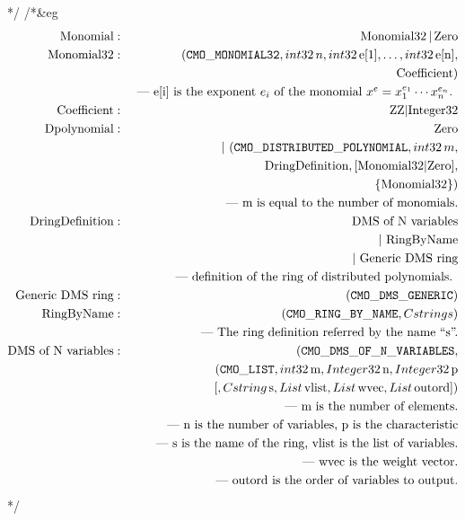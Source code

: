 */
/*&eg
\begin{eqnarray*}
\mbox{Monomial} &:& \mbox{Monomial32}\, |\, \mbox{Zero} \\
\mbox{Monomial32}&:& ({\tt CMO\_MONOMIAL32}, {\sl int32}\, n,
                      {\sl int32}\, \mbox{e[1]}, \ldots,
                      {\sl int32}\, \mbox{e[n]}, \\
                 & & \ \mbox{Coefficient}) \\
                 & & \mbox{ --- e[i] is the exponent $e_i$ of the monomial 
                      $x^e = x_1^{e_1} \cdots x_n^{e_n}$. } \\
\mbox{Coefficient}&:& \mbox{ZZ} | \mbox{Integer32} \\
\mbox{Dpolynomial}&:& \mbox{Zero} \\
                 & & |\ ({\tt CMO\_DISTRIBUTED\_POLYNOMIAL},{\sl int32}\, m, \\
                 & & \ \ \mbox{DringDefinition}, [\mbox{Monomial32}|\mbox{Zero}], \\
                 & &\ \ 
                    \{\mbox{Monomial32}\})  \\
                 & &\mbox{--- m is equal to the number of monomials.}\\
\mbox{DringDefinition}
                 &:& \mbox{DMS of N variables} \\
                 & & |\ \mbox{RingByName} \\
                 & & |\ \mbox{Generic DMS ring} \\
                 & & \mbox{ --- definition of the ring of distributed polynomials. } \\
\mbox{Generic DMS ring}
                 &:& ({\tt CMO\_DMS\_GENERIC}) \\
\mbox{RingByName}&:& ({\tt CMO\_RING\_BY\_NAME}, {\sl Cstring} s) \\
                 & & \mbox{ --- The ring definition referred by the name ``s''.} \\
\mbox{DMS of N variables}
                 &:& ({\tt CMO\_DMS\_OF\_N\_VARIABLES}, \\
                 & & \ ({\tt CMO\_LIST}, {\sl int32}\, \mbox{m},
                  {\sl Integer32}\,  \mbox{n}, {\sl Integer32}\, \mbox{p} \\
                 & & \ \ [,{\sl Cstring}\,\mbox{s}, {\sl List}\, \mbox{vlist},
                          {\sl List}\, \mbox{wvec}, {\sl List}\, \mbox{outord}]) \\
                 & & \mbox{ --- m is the number of elements.} \\
                 & & \mbox{ --- n is the number of variables, p is the characteristic} \\
                 & & \mbox{ --- s is the name of the ring, vlist is the list of variables.} \\
                 & & \mbox{ --- wvec is the weight vector.} \\
                 & & \mbox{ --- outord is the order of variables to output.} \\
\end{eqnarray*}
*/

